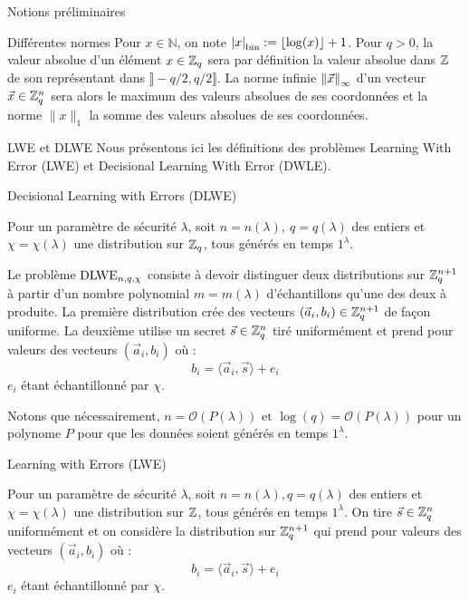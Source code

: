 \begin{section}{Notions préliminaires}
	\begin{subsection}{Différentes normes}
Pour $x\in \mathbb{N}$, on note ${|x|}_{\text{bin}} := \lfloor \log(x) \rfloor + 1$.
Pour $q > 0$, la valeur absolue d'un élément $x \in \mathbb{Z}_q$
sera par définition la valeur absolue dans $\mathbb{Z}$ de son représentant dans
$\rrbracket - q/2, q/2 \rrbracket$. 
	La norme infinie ${\|\vec{x}\|}_{\infty}$ d'un vecteur $\vec{x} \in \mathbb{Z}_q^n$ sera 
alors le maximum des valeurs absolues de ses coordonnées et la norme
$\|x\|_{1}$ la somme des valeurs absolues de ses coordonnées.

	\end{subsection}
	\begin{subsection}{LWE et DLWE}
	Nous présentons ici les définitions des problèmes Learning With Error (LWE) et Decisional Learning 
	With Error (DWLE).
	
	\begin{definition}{Decisional Learning with Errors (DLWE)}

	Pour un paramètre de sécurité $\lambda$, soit $n = n(\lambda),\ q = q(\lambda)$ des entiers et $\chi =
	\chi(\lambda)$ une distribution sur $\mathbb{Z}_q$, tous générés en temps $1^\lambda$.
	
	Le problème $\text{DLWE}_{n,q,\chi}$ consiste à devoir distinguer deux distributions sur $\mathbb{Z}_q^{n+1}$ à partir d'un nombre
	polynomial $m = m(\lambda)$ d'échantillons qu'une des deux à produite. La première distribution crée des
	vecteurs $(\vec{a}_i,b_i) \in \mathbb{Z}_q^{n+1}$ de façon uniforme. La deuxième utilise un secret $\vec{s} \in \mathbb{Z}_q^n$
	tiré uniformément et prend pour valeurs des vecteurs $(\vec{a}_i, b_i)$ où : 
	\[ b_i = \langle \vec{a}_i, \vec{s} \rangle + e_i \] 
	$e_i$ étant échantillonné par $\chi$.
	\end{definition}
	Notons que nécessairement, $n = \mathcal{O}(P(\lambda))\text{ et }\log(q) = \mathcal{O}(P(\lambda))$ pour un polynome $P$ pour que
	les données soient générés en temps $1^\lambda$.

	\begin{definition}{Learning with Errors (LWE)}
	
	Pour un paramètre de sécurité $\lambda$, soit $n = n(\lambda),q = q(\lambda)$ des entiers et $\chi =
	\chi(\lambda)$ une distribution sur $\mathbb{Z}$, tous générés en temps $1^\lambda$.  
	On tire $\vec{s} \in \mathbb{Z}_q^n$ uniformément et on considère la distribution sur $\mathbb{Z}_q^{n+1}$ qui prend pour valeurs des vecteurs
	$(\vec{a}_i, b_i)$ où : \[ b_i = \langle \vec{a}_i, \vec{s} \rangle + e_i \] $e_i$ étant échantillonné par
	$\chi$.


\end{definition}
\end{subsection}
\end{section}
